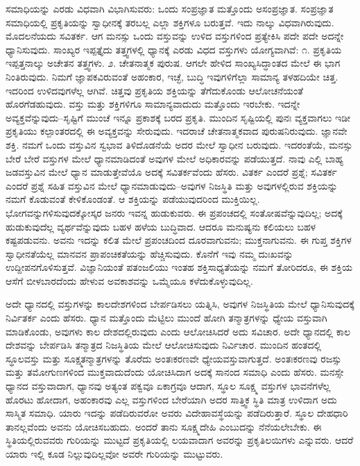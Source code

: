 ಸಮಾಧಿಯನ್ನು ಎರಡು ವಿಧವಾಗಿ ವಿಭಾಗಿಸುವರು: ಒಂದು ಸಂಪ್ರಜ್ಞಾತ ಮತ್ತೊಂದು ಅಸಂಪ್ರಜ್ಞಾತ. ಸಂಪ್ರಜ್ಞಾತ ಸಮಾಧಿಯಲ್ಲಿ ಪ್ರಕೃತಿಯನ್ನು ಸ್ವಾಧೀನಕ್ಕೆ ತರಬಲ್ಲ ಎಲ್ಲಾ ಶಕ್ತಿಗಳೂ ಬರುತ್ತವೆ. ಇದು ನಾಲ್ಕು ವಿಧವಾಗಿರುವುದು. ಮೊದಲನೆಯದು ಸವಿತರ್ಕ. ಆಗ ಮನಸ್ಸು ಒಂದು ವಸ್ತುವನ್ನು ಉಳಿದ ವಸ್ತುಗಳಿಂದ ಪ್ರತ್ಯೇಕಿಸಿ ಪದೇ ಪದೇ ಅದನ್ನೇ ಧ್ಯಾನಿಸುವುದು. ಸಾಂಖ್ಯರ ಇಪ್ಪತ್ತೈದು ತತ್ತ್ವಗಳಲ್ಲಿ ಧ್ಯಾನಕ್ಕೆ ಎರಡು ವಿಧದ ವಸ್ತುಗಳು ಯೋಗ್ಯವಾಗಿವೆ: ೧. ಪ್ರಕೃತಿಯ ಇಪ್ಪತ್ತನಾಲ್ಕು ಅಚೇತನ ತತ್ತ್ವಗಳು. ೨. ಚೇತನಾತ್ಮಕ ಪುರುಷ. ಆಗಲೇ ಹೇಳಿದ ಸಾಂಖ್ಯಸಿದ್ಧಾಂತದ ಮೇಲೆ ಈ ಭಾಗ ನಿಂತಿರುವುದು. ನಿಮಗೆ ಜ್ಞಾಪಕವಿರುವಂತೆ ಅಹಂಕಾರ, ಇಚ್ಛೆ, ಬುದ್ಧಿ ಇವುಗಳಿಗೆಲ್ಲಾ ಸಾಮಾನ್ಯ ತಳಹದಿಯೇ ಚಿತ್ತ. ಇದರಿಂದ ಉಳಿದವುಗಳೆಲ್ಲ ಆಗಿವೆ. ಚಿತ್ತವು ಪ್ರಕೃತಿಯ ಶಕ್ತಿಯನ್ನು ತೆಗೆದುಕೊಂಡು ಆಲೋಚನೆಯಂತೆ ಹೊರಗೆಡಹುವುದು. ವಸ್ತು ಮತ್ತು ಶಕ್ತಿಗಳಿಗೂ ಸಾಮಾನ್ಯವಾದುದು ಮತ್ತೊಂದು ಇರಬೇಕು. ಇದನ್ನೇ ಅವ್ಯಕ್ತವೆನ್ನುವುದು–ಸೃಷ್ಟಿಗೆ ಮುಂಚೆ ಇನ್ನೂ ಪ್ರಕಾಶಕ್ಕೆ ಬರದ ಪ್ರಕೃತಿ. ಮುಂದಿನ ಸೃಷ್ಟಿಯಲ್ಲಿ ಪುನಃ ವ್ಯಕ್ತವಾಗಲು ಇಡೀ ಪ್ರಕೃತಿಯು ಕಲ್ಪಾಂತರದಲ್ಲಿ ಈ ಅವ್ಯಕ್ತವನ್ನು ಸೇರುವುದು. ಇದರಾಚೆ ಚೇತನಾತ್ಮಕವಾದ ಪುರುಷನಿರುವುದು. ಜ್ಞಾನವೇ ಶಕ್ತಿ. ನಮಗೆ ಒಂದು ವಸ್ತುವಿನ ಸ್ವಭಾವ ತಿಳಿದೊಡನೆಯೆ ಅದರ ಮೇಲೆ ಸ್ವಾಧೀನ ಬರುವುದು. ಇದರಂತೆಯೆ, ಮನಸ್ಸು ಬೇರೆ ಬೇರೆ ವಸ್ತುಗಳ ಮೇಲೆ ಧ್ಯಾನಮಾಡಿದಂತೆ ಅವುಗಳ ಮೇಲೆ ಅಧಿಕಾರವನ್ನು ಪಡೆಯುತ್ತದೆ. ನಾವು ಎಲ್ಲಿ ಬಾಹ್ಯ ಜಡವಸ್ತುವಿನ ಮೇಲೆ ಧ್ಯಾನ ಮಾಡುತ್ತೇವೆಯೊ ಅದಕ್ಕೆ ಸವಿತರ್ಕವೆಂದು ಹೆಸರು. ವಿತರ್ಕ ಎಂದರೆ ಪ್ರಶ್ನೆ; ಸವಿತರ್ಕ ಎಂದರೆ ಪ್ರಶ್ನೆ ಸಹಿತ ವಸ್ತುವಿನ ಮೇಲೆ ಧ್ಯಾನಮಾಡುವುದು–ಅವುಗಳ ನಿಜಸ್ಥಿತಿ ಮತ್ತು ಅವುಗಳಲ್ಲಿರುವ ಶಕ್ತಿಯನ್ನು ನಮಗೆ ಕೊಡುವಂತೆ ಕೇಳಿಕೊಂಡಂತೆ. ಆ ಶಕ್ತಿಯನ್ನು ಪಡೆಯುವುದರಿಂದ ಮುಕ್ತಿಯಿಲ್ಲ. ಭೋಗವನ್ನುಗಳಿಸುವುದಕ್ಕೋಸ್ಕರ ಜನರು ಇವನ್ನ ಹುಡುಕುವರು. ಈ ಪ್ರಪಂಚದಲ್ಲಿ ಸಂತೋಷವೆನ್ನುವುದಿಲ್ಲ; ಅದಕ್ಕೆ ಹುಡುಕುವುದೆಲ್ಲ ವ್ಯರ್ಥವೆನ್ನುವುದು ಬಹಳ ಹಳೆಯ ಬುದ್ಧಿವಾದ. ಆದರೂ ಮನುಷ್ಯನು ಕಲಿಯಲು ಬಹಳ ಕಷ್ಟಪಡುವನು. ಅವನು ಇದನ್ನು ಕಲಿತ ಮೇಲೆ ಪ್ರಪಂಚದಿಂದ ದೂರವಾಗುವನು; ಮುಕ್ತನಾಗುವನು. ಈ ಗುಪ್ತ ಶಕ್ತಿಗಳ ಸ್ವಾಧೀನತೆಯೆಲ್ಲ ಮಾನವನ ಪ್ರಾಪಂಚಿಕತೆಯನ್ನು ಹೆಚ್ಚಿಸುವುದು. ಕೊನೆಗೆ ಇವು ನಮ್ಮ ದುಃಖವನ್ನು ಉದ್ದೀಪನಗೊಳಿಸುತ್ತವೆ. ವಿಜ್ಞಾನಿಯಂತೆ ಪತಂಜಲಿಯು ಇಂತಹ ಶಕ್ತಿಸಾಧ್ಯತೆಯನ್ನು ನಮಗೆ ತೋರಿದರೂ, ಈ ಶಕ್ತಿಯ ಆಸೆಗೆ ಬೀಳಬಾರದೆಂದು ಹೇಳುವ ಅವಕಾಶವನ್ನು ಒಮ್ಮೆಯೂ ಕಳೆದುಕೊಳ್ಳುವುದಿಲ್ಲ. 

\newpage

ಅದೇ ಧ್ಯಾನದಲ್ಲಿ ವಸ್ತುಗಳನ್ನು ಕಾಲದೇಶಗಳಿಂದ ಬೇರ್ಪಡಿಸಲು ಯತ್ನಿಸಿ, ಅವುಗಳ ನಿಜಸ್ಥಿತಿಯ ಮೇಲೆ ಧ್ಯಾನಿಸುವುದಕ್ಕೆ ನಿರ್ವಿತರ್ಕ ಎಂದು ಹೆಸರು. ಧ್ಯಾನ ಮತ್ತೊಂದು ಮೆಟ್ಟಿಲು ಮುಂದೆ ಹೋಗಿ ತನ್ಮಾತ್ರಗಳನ್ನು ಧ್ಯೇಯ ವಸ್ತುವಾಗಿ ಮಾಡಿಕೊಂಡು, ಅವುಗಳು ಕಾಲ ದೇಶದಲ್ಲಿರುವುದು ಎಂದು ಆಲೋಚಿಸಿದರೆ ಅದು ಸವಿಚಾರ. ಅದೇ ಧ್ಯಾನದಲ್ಲಿ ಕಾಲ ದೇಶವನ್ನು ಬೇರ್ಪಡಿಸಿ ತನ್ಮಾತ್ರದ ನಿಜಸ್ಥಿತಿಯ ಮೇಲೆ ಆಲೋಚಿಸುವುದು ನಿರ್ವಿಚಾರ. ಮುಂದಿನ ಹಂತದಲ್ಲಿ ಸ್ಥೂಲವಸ್ತು ಮತ್ತು ಸೂಕ್ಷ್ಮತನ್ಮಾತ್ರಗಳನ್ನು ತೊರೆದು ಅಂತಃಕರಣವೇ ಧ್ಯೇಯವಸ್ತುವಾಗುತ್ತದೆ. ಅಂತಃಕರಣವು ರಜಸ್ಸು ಮತ್ತು ತಮೋಗುಣಗಳಿಂದ ಮುಕ್ತವಾದುದೆಂದು ಯೋಚಿಸಿದಾಗ ಅದಕ್ಕೆ ಸಾನಂದ ಸಮಾಧಿ ಎಂದು ಹೆಸರು. ಮನಸ್ಸೇ ಧ್ಯಾನದ ವಸ್ತುವಾದಾಗ, ಧ್ಯಾನವು ಅತ್ಯಂತ ಪಕ್ವವೂ ಏಕಾಗ್ರವೂ ಆದಾಗ, ಸ್ಥೂಲ ಸೂಕ್ಷ್ಮ ವಸ್ತುಗಳ ಭಾವನೆಗಳೆಲ್ಲ ಹೊರಟು ಹೋದಾಗ, ಅಹಂಕಾರವು ಎಲ್ಲ ವಸ್ತುಗಳಿಂದ ಬೇರೆಯಾಗಿ ಅದರ ಸಾತ್ತ್ವಿಕ ಸ್ಥಿತಿ ಮಾತ್ರ ಉಳಿದಾಗ ಅದು ಸಾಸ್ಮಿತ ಸಮಾಧಿ. ಯಾರು ಇದನ್ನು ಪಡೆದಿರುವರೋ ಅವರು ವಿದೇಹಾವಸ್ಥೆಯನ್ನು ಪಡೆದಿರುತ್ತಾರೆ. ಸ್ಥೂಲ ದೇಹಧಾರಿ ತಾನಲ್ಲವೆಂದು ಅವನು ಯೋಚಿಸಬಹುದು. ಅಂದರೆ ತಾನು ಸೂಕ್ಷ್ಮದೇಹಿ ಎಂಬುದನ್ನು ನೆನೆಯಲೇಬೇಕು. ಈ ಸ್ಥಿತಿಯಲ್ಲಿರುವವರು ಗುರಿಯನ್ನು ಮುಟ್ಟದೆ ಪ್ರಕೃತಿಯಲ್ಲಿ ಲಯವಾದಾಗ ಅವರನ್ನು ಪ್ರಕೃತಿಲಯಿಗಳು ಎನ್ನುವರು. ಆದರೆ ಯಾರು ಇಲ್ಲಿ ಕೂಡ ನಿಲ್ಲುವುದಿಲ್ಲವೋ ಅವರೇ ಗುರಿಯನ್ನು ಮುಟ್ಟುವರು. 

